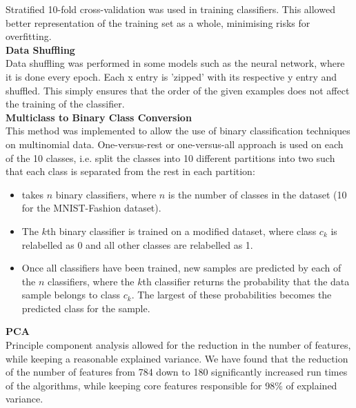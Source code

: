\documentclass[11pt,a4paper]{article}
\begin{document}
\noindent Stratified 10-fold cross-validation was used in training classifiers. This allowed better representation of the training set as a whole, minimising risks for overfitting.\\

\noindent
\textbf{Data Shuffling}\\

\noindent Data shuffling was performed in some models such as the neural network, where it is done every epoch. Each x entry is 'zipped' with its respective y entry and shuffled. This simply ensures that the order of the given examples does not affect the training of the classifier.\\

\noindent
\textbf{Multiclass to Binary Class Conversion}\\

\noindent This method was implemented to allow the use of binary classification techniques on multinomial data. One-versus-rest or one-versus-all approach is used on each of the 10 classes, i.e. split the classes into 10 different partitions into two such that each class is separated from the rest in each partition:
\begin{itemize}
    \item takes $n$ binary classifiers, where  $n$ is the number of classes in the dataset (10 for the MNIST-Fashion dataset).
    \item The $k$th binary classifier is trained on a modified dataset, where class $c_k$ is relabelled as 0 and all other classes are relabelled as 1.
    \item Once all classifiers have been trained, new samples are predicted by  each of the $n$ classifiers, where the  $k$th classifier returns the probability that the data sample belongs to class  $c_k$. The largest of these probabilities becomes the predicted class for the sample.\\
\end{itemize}

\noindent
\textbf{PCA}\\

\noindent Principle component analysis allowed for the reduction in the number of features, while keeping a reasonable explained variance. We have found that the reduction of the number of features from 784 down to 180 significantly increased run times of the algorithms, while keeping core features responsible for 98\% of explained variance.\\
\end{document}
